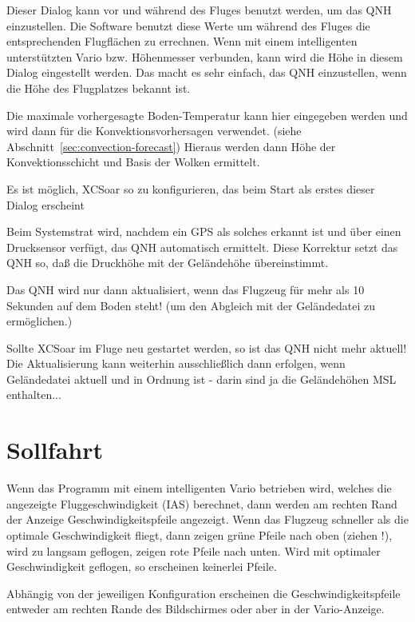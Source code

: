 Dieser Dialog kann vor und während des Fluges benutzt werden, um das QNH einzustellen.
Die Software benutzt diese Werte um während des Fluges die entsprechenden Flugflächen
zu errechnen. Wenn mit einem intelligenten unterstützten Vario bzw. Höhenmesser verbunden,
kann wird die Höhe in diesem Dialog eingestellt werden. Das macht es sehr einfach,
das QNH einzustellen, wenn die Höhe des Flugplatzes bekannt ist.


Die maximale vorhergesagte Boden-Temperatur kann hier eingegeben werden und wird dann für die
Konvektionsvorhersagen verwendet. (siehe Abschnitt~\ref{sec:convection-forecast})
Hieraus werden dann Höhe der Konvektionsschicht und Basis der Wolken ermittelt.

\tip Es ist möglich, \textsf{XCSoar} so zu konfigurieren, das beim Start als erstes dieser Dialog erscheint

Beim Systemstrat wird, nachdem ein GPS als solches erkannt ist und über einen Drucksensor verfügt,
das QNH automatisch ermittelt.  Diese Korrektur setzt das QNH so, daß die Druckhöhe mit der
Geländehöhe übereinstimmt.

Das QNH wird nur dann aktualisiert, wenn das Flugzeug für mehr als 10 Sekunden auf dem Boden
steht! (um den Abgleich mit der Geländedatei zu ermöglichen.)

Sollte \textsf{XCSoar} im Fluge neu gestartet werden, so ist das QNH nicht mehr aktuell! 
Die Aktualisierung kann weiterhin ausschließlich dann erfolgen, wenn Geländedatei aktuell und in
Ordnung ist - darin sind ja die Geländehöhen MSL enthalten...

\section{Sollfahrt}

Wenn das Programm mit einem intelligenten Vario betrieben wird, welches die angezeigte
Fluggeschwindigkeit (IAS) berechnet, dann werden am rechten Rand der Anzeige Geschwindigkeitspfeile
angezeigt. Wenn das Flugzeug schneller als die optimale Geschwindigkeit fliegt, dann zeigen grüne Pfeile
nach oben (ziehen !), wird zu langsam geflogen, zeigen rote Pfeile nach unten. Wird mit optimaler
Geschwindigkeit geflogen, so erscheinen keinerlei Pfeile.


Abhängig von der jeweiligen Konfiguration erscheinen die Geschwindigkeitspfeile entweder
am rechten Rande des Bildschirmes oder aber in der Vario-Anzeige.

